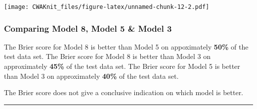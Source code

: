 \documentclass[]{article}
\newenvironment{Shaded}{\begin{snugshade}}{\end{snugshade}}
\newcommand{\KeywordTok}[1]{\textcolor[rgb]{0.13,0.29,0.53}{\textbf{#1}}}
\newcommand{\DataTypeTok}[1]{\textcolor[rgb]{0.13,0.29,0.53}{#1}}
\newcommand{\DecValTok}[1]{\textcolor[rgb]{0.00,0.00,0.81}{#1}}
\newcommand{\FloatTok}[1]{\textcolor[rgb]{0.00,0.00,0.81}{#1}}
\newcommand{\StringTok}[1]{\textcolor[rgb]{0.31,0.60,0.02}{#1}}
\newcommand{\OperatorTok}[1]{\textcolor[rgb]{0.81,0.36,0.00}{\textbf{#1}}}
\newcommand{\NormalTok}[1]{#1}
\begin{document}
\begin{Shaded}
\end{Shaded}

\texttt{[image: CWAKnit\_files/figure-latex/unnamed-chunk-12-2.pdf]}

\subsubsection{Comparing Model 8, Model 5 \& Model
3}\label{comparing-model-8-model-5-model-3}

The Brier score for Model 8 is better than Model 5 on appoximately
\textbf{50\%} of the test data set. The Brier score for Model 8 is
better than Model 3 on approximately \textbf{45\%} of the test data set.
The Brier score for Model 5 is better than Model 3 on approximately
\textbf{40\%} of the test data set.

The Brier score does not give a conclusive indication on which model is
better.

\begin{center}\rule{0.5\linewidth}{\linethickness}\end{center}
\end{document}
